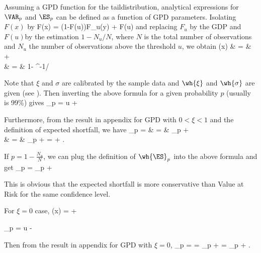 Assuming a GPD function for the taildistribution, analytical expressions for $\VAR_p$ and $\ES_p$ can be defined as a function of GPD parameters. Isolating $F(x)$ by
\be
F(x) = (1-F(u))F_u(y) + F(u)
\ee
and replacing $F_u$ by the GDP and $F(u)$by the estimation $1-N_u/N$, where $N$ is the total number of observations and $N_u$ the number of observations above the threshold $u$, we obtain
\beast
{}(x) & = &   +  \\
& = &  1- ^{-1/\wh{\xi}}
\eeast

Note that $\xi$ and $\sigma$ are calibrated by the sample data and $\wh{\xi}$ and $\wh{\sigma}$ are given (see \cite{Gilli_Kellezi_2006}). Then inverting the above formula for a given probability $p$ (usually is 99\%) gives
\be
\wh{\VAR}_p = u + \frac{\wh{\xi}}{\wh{\sigma}}%
\ee

Furthermore, from the result in appendix for GPD with $0<\xi <1$ %
and the definition of expected shortfall, we have
\beast
\wh{\ES}_p = \E{} & = & %
\wh{\VAR}_p + \E{} \\%
& = & \wh{\VAR}_p +  =  + .
\eeast

If $p = 1- \frac {N_u}{N}$, we can plug the definition of $\wh{\ES}_p$ into the above formula and get
\be
\wh{\ES}_p = \wh{\VAR}_p + 
\ee

This is obvious that the expected shortfall is more conservative than Value at Risk for the same confidence level.

For $\xi = 0$ case,
\be
{}(x) =   + 
\ee

\be
\wh{\VAR}_p = u - \frac{\wh{\xi}}{\wh{\sigma}}\ln{}%
\ee

Then from the result in appendix for GPD with $\xi =0$,
\be
\wh{\ES}_p = \E{} = \wh{\VAR}_p + \E{} = \wh{\VAR}_p + \wh{\sigma}.
\ee
